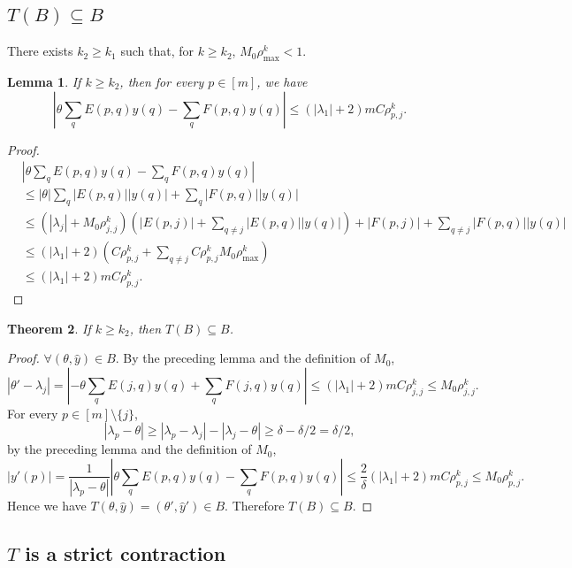 \documentclass[11pt,a4paper]{article}
\theoremstyle{plain}              %
\newtheorem{theorem}{Theorem}[section]
\newtheorem{lemma}[theorem]{Lemma}
\theoremstyle{definition}         %
\begin{document}
\subsection{\(T(B)\subseteq B\)}

There exists \(k_2\geq k_1\) such that, for \(k\geq k_2\), \(M_0\rho_{\max}^k<1\).

\begin{lemma}
If \(k\geq k_2\), then for every \(p\in[m]\), we have
\[
\left|\theta\sum_{q}E(p,q)y(q)-\sum_{q}F(p,q)y(q)\right|\leq(|\lambda_1|+2)mC\rho_{p,j}^k.
\]
\end{lemma}
\begin{proof}
\begin{align*}
&\left|\theta\sum_{q}E(p,q)y(q)-\sum_{q}F(p,q)y(q)\right|\\
&\leq|\theta|\sum_{q}|E(p,q)||y(q)|+\sum_{q}|F(p,q)||y(q)|\\
&\leq(|\lambda_j|+M_0\rho_{j,j}^k)\left(|E(p,j)|+\sum_{q\neq j}|E(p,q)||y(q)|\right)+|F(p,j)|+\sum_{q\neq j}|F(p,q)||y(q)|\\
&\leq(|\lambda_1|+2)\left(C\rho_{p,j}^k+\sum_{q\neq j}C\rho_{p,j}^kM_0\rho_{\max}^k\right)\\
&\leq(|\lambda_1|+2)mC\rho_{p,j}^k.
\end{align*}
\end{proof}

\begin{theorem}
If \(k\geq k_2\), then \(T(B)\subseteq B\).
\end{theorem}
\begin{proof}
\(\forall (\theta,\hat{y})\in B\). By the preceding lemma and the definition of \(M_0\),
\[
|\theta'-\lambda_j|=\left|-\theta\sum_{q}E(j,q)y(q)+\sum_{q}F(j,q)y(q)\right|\leq (|\lambda_1|+2)mC\rho_{j,j}^k\leq M_0\rho_{j,j}^k.
\]
For every \(p\in[m]\setminus\{j\}\),
\[
|\lambda_p-\theta|\geq|\lambda_p-\lambda_j|-|\lambda_j-\theta|\geq\delta-\delta/2=\delta/2,
\]
by the preceding lemma and the definition of \(M_0\),
\[
|y'(p)|=\dfrac{1}{|\lambda_p-\theta|}\left|\theta\sum_{q}E(p,q)y(q)-\sum_{q}F(p,q)y(q)\right|\leq\dfrac{2}{\delta}(|\lambda_1|+2)mC\rho_{p,j}^k\leq M_0\rho_{p,j}^k.
\]
Hence we have \(T(\theta,\hat{y})=(\theta',\hat{y}')\in B\). Therefore \(T(B)\subseteq B\).
\end{proof}

\subsection{\(T\) is a strict contraction}
\end{document}
